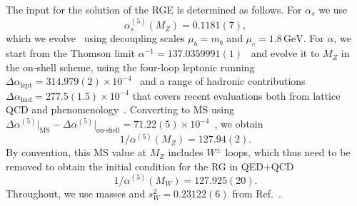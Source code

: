 \documentclass[prl,twocolumn,twoside,preprintnumbers,superscriptaddress,nofootinbib,letterpaper]{revtex4-1}
\newcommand{\GeV}{\,\text{GeV}}
\newcommand{\beq}{\begin{equation}}
\newcommand{\eeq}{\end{equation}}
\begin{document}
The input for the solution of the RGE is determined as follows. For $\alpha_s$ we use~\cite{FlavourLatticeAveragingGroupFLAG:2024oxs,ParticleDataGroup:2026,Maltman:2008bx,PACS-CS:2009zxm,McNeile:2010ji,Chakraborty:2014aca,Bruno:2017gxd,Bazavov:2019qoo,Cali:2020hrj,Ayala:2020odx,Petreczky:2020tky,DallaBrida:2022eua}
\beq
\alpha_s^{(5)}(M_Z)=0.1181(7),
\eeq
which we evolve~\cite{Chetyrkin:2000yt,Herren:2017osy} using decoupling scales $\mu_b=m_b$ and $\mu_c=1.8\GeV$. For $\alpha$, we start from the Thomson limit $\alpha^{-1}=137.0359991(1)$~\cite{Parker:2018vye,Morel:2020dww,Fan:2022eto} and evolve it to $M_Z$ in the on-shell scheme, using the four-loop leptonic running $\Delta\alpha_\text{lept}=314.979(2)\times 10^{-4}$~\cite{Sturm:2013uka} and a range of hadronic contributions $\Delta\alpha_\text{had}=277.5(1.5)\times 10^{-4}$ that covers recent evaluations both from lattice QCD and phenomenology~\cite{Davier:2019can,Keshavarzi:2019abf,Ce:2022eix,Erler:2023hyi,Conigli:2025qvh}. Converting to $\overline{\text{MS}}$ using $\Delta \alpha^{(5)}\big|_{\overline{\text{MS}}}-\Delta \alpha^{(5)}\big|_\text{on-shell}=71.22(5)\times 10^{-4}$~\cite{ParticleDataGroup:2026,Chetyrkin:1996cf}, we obtain
\beq
1/\alpha^{(5)}(M_Z)=127.94(2).
\eeq
By convention, this $\overline{\text{MS}}$ value at $M_Z$ includes $W^\pm$ loops, which thus need to be removed to obtain the initial condition for the RG in QED+QCD~\cite{Fanchiotti:1992tu,Cirigliano:2023fnz}
\beq
1/\alpha^{(5)}(M_W)=127.925(20).
\eeq
Throughout, we use masses and $s_W^2=0.23122(6)$ from Ref.~\cite{ParticleDataGroup:2026}.


\end{document}
